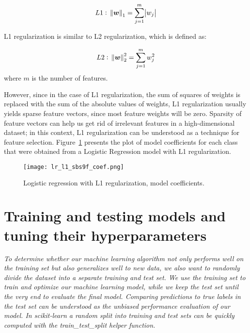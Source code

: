 \begin{equation} \label{eq:l1_regularization}
    L1:~\norm{\boldsymbol{w}}_1 = \sum \limits_{j=1}^m \abs{w_j}
\end{equation}

L1 regularization is similar to L2 regularization, which is defined as:

\begin{equation} \label{eq:l2_regularization}
    L2:~\norm{\boldsymbol{w}}_2^2 = \sum \limits_{j=1}^m w_j^2
\end{equation}
where $m$ is the number of features.

However, since in the case of L1 regularization, the sum of squares of weights is replaced with the sum of the absolute values of weights, L1 regularization usually yields sparse feature vectors, since most feature weights will be zero\cite{RaschkaMirjalili2017,Scikit-learndevelopers2019}.
Sparsity of feature vectors can help us get rid of irrelevant features in a high-dimensional dataset;
in this context, L1 regularization can be understood as a technique for feature selection\cite{RaschkaMirjalili2017}.
Figure~\ref{fig:lr_l1_sbs9f_coef} presents the plot of model coefficients for each class that were obtained from a Logistic Regression model with L1 regularization.

\begin{figure}[hbt!]
    \centering
    \texttt{[image: lr\_l1\_sbs9f\_coef.png]}
    \caption{Logistic regression with L1 regularization, model coefficients.}
    \label{fig:lr_l1_sbs9f_coef}
\end{figure}

\section{Training and testing models and tuning their hyperparameters} \label{sec:train_test_validate_model}

\textit{To determine whether our machine learning algorithm not only performs well on the training set but also generalizes well to new data, we also want to randomly divide the dataset into a separate training and test set. We use the training set to train and optimize our machine learning model, while we keep the test set until the very end to evaluate the final model. Comparing predictions to true labels in the test set can be understood as the unbiased performance evaluation of our model. In scikit-learn a random split into training and test sets can be quickly computed with the train\_test\_split helper function.}\cite{RaschkaMirjalili2017}

